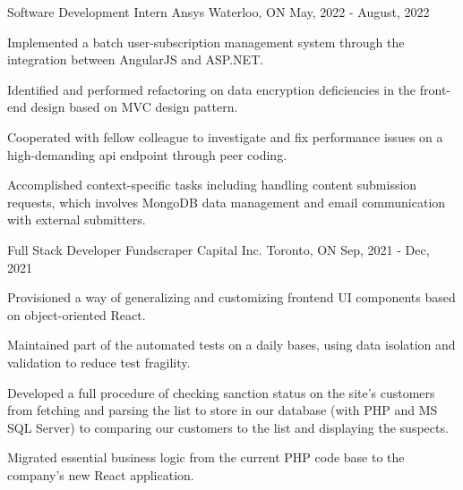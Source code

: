 

\begin{cventries}

  \cventry
	{Software Development Intern} %
	{Ansys} %
	{Waterloo, ON} %
	{May, 2022 - August, 2022} %
	{
		\begin{cvitems} %
			\item {Implemented a batch user-subscription management system through the integration between AngularJS and ASP.NET.}
			\item {Identified and performed refactoring on data encryption deficiencies in the front-end  design based on MVC design pattern.}
			\item {Cooperated with fellow colleague to investigate and fix performance issues on a high-demanding api endpoint through peer coding.}
			\item {Accomplished context-specific tasks including handling content submission requests, which involves MongoDB data management and email communication with external submitters.}
		\end{cvitems}
	}

  \cventry
    {Full Stack Developer} %
    {Fundscraper Capital Inc.} %
    {Toronto, ON} %
    {Sep, 2021 - Dec, 2021} %
    {
		\begin{cvitems} %
			\item {Provisioned a way of generalizing and customizing frontend UI components based on object-oriented React.}
			\item {Maintained part of the automated tests on a daily bases, using data isolation and validation to reduce test fragility.}
			\item {Developed a full procedure of checking sanction status on the site's customers from fetching and parsing the list to store in our database (with PHP and MS SQL Server) to comparing our customers to the list and displaying the suspects.}
			\item {Migrated essential business logic from the current PHP code base to the company's new React application.}
		\end{cvitems}
    }


\end{cventries}

